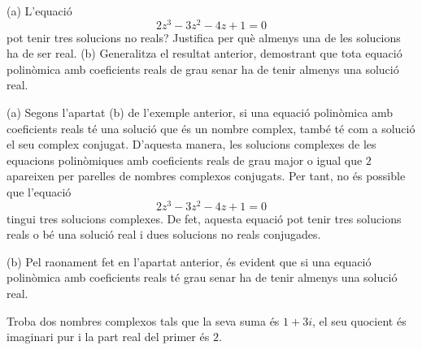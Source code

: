 \begin{exemple}
(a) L’equació
\begin{equation*}
2z^{3}-3z^{2}-4z+1=0
\end{equation*}
pot tenir tres solucions no reals? Justifica per què almenys una de les solucions ha de ser real. (b) Generalitza el
resultat anterior, demostrant que tota equació polinòmica amb
coeficients reals de grau senar ha de tenir almenys una solució real.
\end{exemple}

\begin{solucio}
(a) Segons l’apartat (b) de l’exemple anterior, si una equació polinòmica amb coeficients reals té una solució que és un nombre
complex, també té com a solució el seu complex conjugat. D’aquesta manera, les solucions complexes de les equacions polinòmiques amb
coeficients reals de grau major o igual que $2$ apareixen per parelles de nombres complexos conjugats. Per tant, no és possible que l’equació
\begin{equation*}
2z^{3}-3z^{2}-4z+1=0
\end{equation*}
tingui tres solucions complexes. De fet, aquesta equació pot tenir tres solucions reals o bé una solució real i dues solucions no reals conjugades.

(b) Pel raonament fet en l’apartat anterior, és evident que
si una equació polinòmica amb coeficients reals té grau senar
ha de tenir almenys una solució real.
\end{solucio}

\begin{exemple}
Troba dos nombres complexos tals que la seva suma és $1+3i$, el seu quocient és
imaginari pur i la part real del primer és $2$.
\end{exemple}

